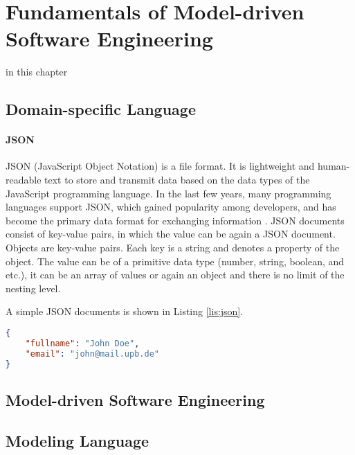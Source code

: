 \chapter{Fundamentals of Model-driven Software Engineering}
\label{ch:fundamentals}

in this chapter

\section{Domain-specific Language}
\subsubsection{JSON}
JSON (JavaScript Object Notation) is a file format. It is lightweight and human-readable text to store and transmit data based on the data types of the JavaScript programming language. In the last few years, many programming languages support JSON, which gained popularity among developers, and has become the primary data format for exchanging information \cite{json-schema}. JSON documents consist of key-value pairs, in which the value can be again a JSON document. Objects are key-value pairs. Each key is a string and denotes a property of the object. The value can be of a primitive data type (number, string, boolean, and etc.), it can be an array of values or again an object and there is no limit of the nesting level. 

A simple JSON documents is shown in Listing \ref{lis:json}.

\lstset{
  label=lis:json, caption=A simple JSON document., 
}
\begin{lstlisting}[language=json]
{
    "fullname": "John Doe",
    "email": "john@mail.upb.de"
}
\end{lstlisting}
\section{Model-driven Software Engineering}
\section{Modeling Language}